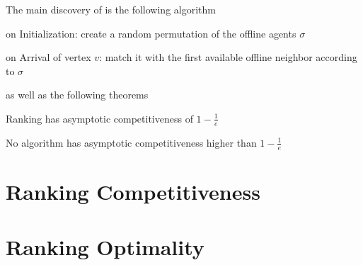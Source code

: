 The main discovery of \cite{karp} is the following algorithm

\begin{algorithm}
	\caption{Ranking}
	\label{alg:ranking}
	\begin{algorithmic}
		\item on Initialization: create a random permutation of the offline agents $\sigma$
		\item on Arrival of vertex $v$: match it with the first available offline neighbor according to $\sigma$
	\end{algorithmic}
\end{algorithm}

as well as the following theorems

\begin{theorem}
	\label{thm:rank-competitiveness}
	Ranking has asymptotic competitiveness of $1-\frac{1}{e}$
\end{theorem}
\begin{theorem}
	\label{thm:rank-optimal}
	No algorithm has asymptotic competitiveness higher than $1-\frac{1}{e}$
\end{theorem}

\section{Ranking Competitiveness}
	
\section{Ranking Optimality}
	